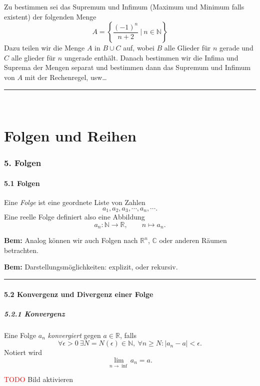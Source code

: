 \documentclass[a4paper,landscape,8pt]{extarticle}
\newcommand{\N}{\mathbb{N}}
\newcommand{\R}{\mathbb{R}}
\newcommand{\C}{\mathbb{C}}
\newcommand{\abs}[1]{\left\lvert #1 \right\rvert}
\newcommand{\setsep}{\ \vert \ }
\newcommand{\todo}{\textcolor{red}{TODO }}
\newcommand{\sep}{\vspace{5pt}\noindent\hrule\vspace{5pt}}
\newcommand{\Bem}{\textbf{Bem: }}
\renewcommand*{\newpage}{ \ }
\begin{document}
\begin{multicols*}{4}
\begin{warmup}
\Bsp Zu bestimmen sei das Supremum und Infimum (Maximum und Minimum falls
existent) der folgenden Menge
\[
A=\left\{
\frac{(-1)^n}{n+2} \setsep n\in \N
\right\}
\]
Dazu teilen wir die Menge $A$ in $B\cup C$ auf, wobei $B$ alle Glieder für $n$
gerade und $C$ alle glieder für $n$ ungerade enthält. Danach bestimmen wir die
Infima und Suprema der Mengen separat und bestimmen dann das Supremum und
Infimum von $A$ mit der Rechenregel, usw\ldots
\end{warmup}

\sep

\newpage

\part{Folgen und Reihen}

\section{5. Folgen}

\subsection{5.1 Folgen}

\Def Eine \emph{Folge} ist eine geordnete Liste von Zahlen
\[
a_1,a_2,a_3,\cdots,a_n,\cdots .
\]
Eine reelle Folge definiert also eine Abbildung
\[
a_n \colon \N \to \R, \qquad n \mapsto a_n.
\]

\Bem Analog können wir auch Folgen nach $\R^n$, $\C$ oder anderen Räumen
betrachten.

\Bem Darstellungsmöglichkeiten: explizit, oder rekursiv.

\sep

\subsection{5.2 Konvergenz und Divergenz einer Folge}

\subsubsection{5.2.1 Konvergenz}

\Def Eine Folge $a_n$ \emph{konvergiert} gegen $a\in \R$, falls
\[
\forall \epsilon > 0 \ \exists N=N(\epsilon)\in\N, \ \forall n\geq
N \colon \abs{a_n-a} < \epsilon.
\]
Notiert wird
\[
\lim_{n\to\inf} a_n = a.
\]

\begin{warmup}
\todo Bild aktivieren
\end{warmup}


\end{multicols*}
\end{document}
